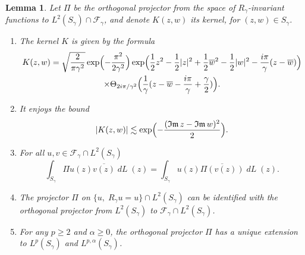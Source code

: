 \documentclass[10pt]{amsart}
\DeclareMathOperator{\dL}{\mathit{dL}}
\newtheorem{lemme}[theorem]{Lemma}
\theoremstyle{definition}
\let\EE\exp
\let\ov\overline
\begin{document}
\begin{lemme}\label{lemme_extension} Let $\Pi$ be the orthogonal projector from the space of $R_\gamma$-invariant functions to ${L^2(S_\gamma) \cap \mathcal{F}_{\gamma}}$, and denote $K(z,w)$ its kernel, for $(z,w) \in S_\gamma$.
\begin{enumerate}
\item\label{lemme_extensioni} The kernel $K$ is given by the formula
\begin{multline}\label{perio}
K(z,w)=\sqrt{\frac{2}{\pi \gamma^2}} \EE\Bigl({-\frac{\pi^2}{2\gamma^2}} \Bigr)\EE\Bigl({\frac{1}{2} z^2 - \frac{1}{2} |z|^2+\frac{1}{2} \ov{w}^2 - \frac{1}{2} |w|^2 -\frac{i\pi}{\gamma} (z- \ov{w})}\Bigr)\\
\times \Theta_{{2i\pi}/{\gamma^2}}\Bigl(\frac{1}{\gamma}(z-\ov{w}-\frac{i\pi}{\gamma}+\frac{\gamma}{2})\Bigr).
\end{multline}
\item\label{lemme_extensionii} It enjoys the bound
\begin{equation}\label{borneK}
|K(z, w)| \lesssim \EE\Bigl(-\frac{(\Im z-\Im w)^2}2\Bigr).
\end{equation}
\item\label{lemme_extensioniii} For all $u,v\in \mathcal{F}_{\gamma} \cap L^2(S_{\gamma})$
\begin{equation}\label{aa}
\int_{S_{\gamma}} \Pi u(z) \ov{v(z)}\dL(z)= \int_{S_{\gamma}} u(z) \ov{\Pi(v(z))}\dL(z).
\end{equation}
\item\label{lemme_extensioniv} The projector $\Pi$ on $\{ u, \; R_\gamma u = u \} \cap L^2(S_\gamma)$ can be identified with the orthogonal projector from $L^2(S_\gamma)$ to $\mathcal{F}_\gamma \cap L^2(S_\gamma)$.
\item\label{lemme_extensionv} For any $p \geq 2$ and $\alpha \geq 0$, the orthogonal projector $\Pi$ has a unique extension to $L^p(S_\gamma)$ and $L^{p,\alpha}(S_\gamma)$.
\end{enumerate}
\end{lemme}
\end{document}
